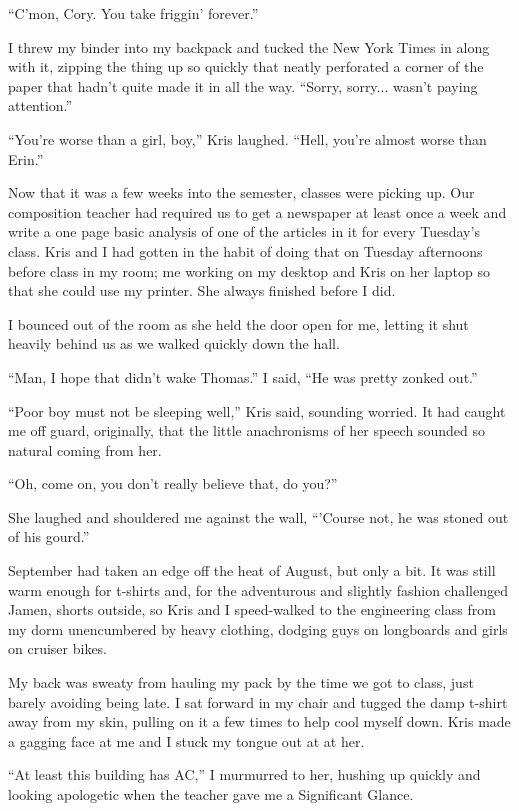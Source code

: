 ``C'mon, Cory.  You take friggin' forever.''

I threw my binder into my backpack and tucked the New York Times in along with it, zipping the thing up so quickly that neatly perforated a corner of the paper that hadn't quite made it in all the way.  ``Sorry, sorry... wasn't paying attention.''

``You're worse than a girl, boy,'' Kris laughed.  ``Hell, you're almost worse than Erin.''

Now that it was a few weeks into the semester, classes were picking up.  Our composition teacher had required us to get a newspaper at least once a week and write a one page basic analysis of one of the articles in it for every Tuesday's class.  Kris and I had gotten in the habit of doing that on Tuesday afternoons before class in my room; me working on my desktop and Kris on her laptop so that she could use my printer.  She always finished before I did.

I bounced out of the room as she held the door open for me, letting it shut heavily behind us as we walked quickly down the hall.

``Man, I hope that didn't wake Thomas.''  I said, ``He was pretty zonked out.''

``Poor boy must not be sleeping well,'' Kris said, sounding worried.  It had caught me off guard, originally, that the little anachronisms of her speech sounded so natural coming from her.

``Oh, come on, you don't really believe that, do you?''

She laughed and shouldered me against the wall, ``'Course not, he was stoned out of his gourd.''

September had taken an edge off the heat of August, but only a bit.  It was still warm enough for t-shirts and, for the adventurous and slightly fashion challenged Jamen, shorts outside, so Kris and I speed-walked to the engineering class from my dorm unencumbered by heavy clothing, dodging guys on longboards and girls on cruiser bikes.

My back was sweaty from hauling my pack by the time we got to class, just barely avoiding being late.  I sat forward in my chair and tugged the damp t-shirt away from my skin, pulling on it a few times to help cool myself down.  Kris made a gagging face at me and I stuck my tongue out at at her.

``At least this building has AC,'' I murmurred to her, hushing up quickly and looking apologetic when the teacher gave me a Significant Glance.

